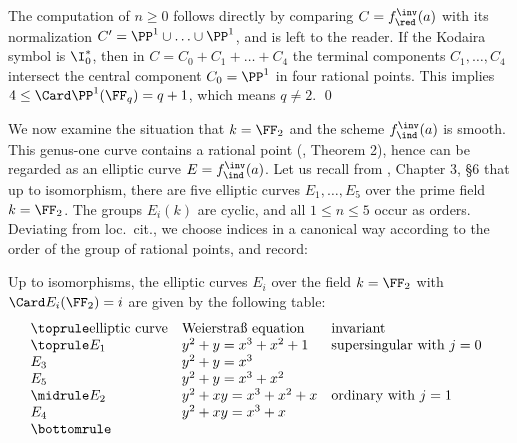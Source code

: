 \proof
The computation of $n\geq 0$ follows directly by comparing $C=f^\inv_\red(a)$ with its normalization $C'=\PP^1\cup\ldots\cup\PP^1$,
and is left to the  reader. If the Kodaira symbol is $\I_0^*$, then in $C=C_0+C_1+\ldots+C_4$
the terminal components $C_1,\ldots,C_4$ intersect the central component $C_0=\PP^1$ in four rational points.
This implies $4\leq \Card\PP^1(\FF_q)=q+1$, which means $q\neq 2$.
\qed


We now   examine the situation that $k=\FF_2$  and  the scheme $ f^\inv_\ind(a)$ is smooth.
This genus-one curve contains a rational point (\cite{Lang-1956}, Theorem 2), hence
can be regarded as an elliptic curve $E=f^\inv_\ind(a)$.
Let us recall from \cite{Husemoller-1987}, Chapter 3, \S6
that up to isomorphism, there are five elliptic curves $E_1,\ldots,E_5$ over the prime field $k=\FF_2$.
The groups $E_i(k)$ are cyclic, and all   $1\leq n\leq 5$ occur as orders. Deviating from loc.\ cit., we
choose indices in a canonical way according to the order of the group of rational points, and record:

\begin{proposition}
\notready
\label{elliptic curves}
Up to isomorphisms, the elliptic curves $E_i$ over the field $k=\FF_2$ with $\Card E_i(\FF_2)=i$
are given by the following table:
$$
\begin{array}[b]{@{}lll}
\toprule
\text{elliptic curve}	& \text{Weierstra\ss{} equation}	& \text{invariant}\\
\toprule
E_1			& y^2+y=x^3+x^2+1 			& \text{supersingular with $j=0$}\\
E_3			& y^2+y=x^3\\
E_5			& y^2+y=x^3+x^2\\
\midrule
E_2			& y^2+xy=x^3+x^2+x  			& \text{ordinary with $j=1$}\\
E_4			& y^2+xy=x^3+x\\
\bottomrule
\end{array}
$$
\end{proposition}


